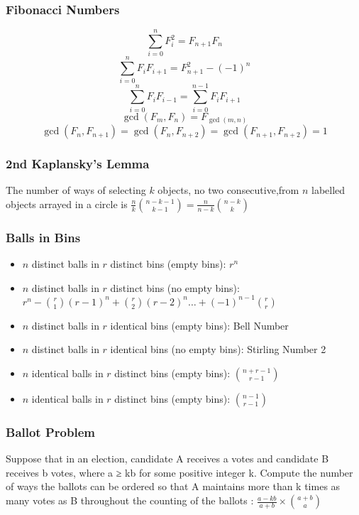 \begin{small}
  \subsubsection{Fibonacci Numbers}
  $$\sum_{i=0}^n F_i^2=F_{n+1} F_n$$
  $$\sum_{i=0}^n F_i F_{i+1}=F_{n+1}^2-(-1)^n$$
  $$\sum_{i=0}^n F_i F_{i-1}=\sum_{i=0}^{n-1} F_i F_{i+1}$$
  $$\operatorname{gcd}\left(F_m, F_n\right)=F_{\operatorname{gcd}(m, n)}$$
  $$\operatorname{gcd}\left(F_n, F_{n+1}\right)=\operatorname{gcd}\left(F_n, F_{n+2}\right)= \operatorname{gcd}\left(F_{n+1}, F_{n+2}\right)=1$$

  \subsubsection{2nd Kaplansky's Lemma}
  The number of ways of selecting \( k \) objects, no two consecutive,from \( n \) labelled objects arrayed in a circle is \( \frac{n}{k} \binom{n-k-1}{k-1} = \frac{n}{n - k} \binom{n-k}{k} \)

  \subsubsection{Balls in Bins}
  \begin{itemize}[noitemsep]
    \itemsep0em 
    \item $n$ distinct balls in $r$ distinct bins (empty bins): $r^{n}$
    \item $n$ distinct balls in $r$ distinct bins (no empty bins): $r^{n} - \binom{r}{1} (r - 1)^{n} + \binom{r}{2} (r - 2)^{n} \ldots + (-1)^{n - 1} \binom{r}{r}$
    \item $n$ distinct balls in $r$ identical bins (empty bins): Bell Number
    \item $n$ distinct balls in $r$ identical bins (no empty bins): Stirling Number 2
    \item $n$ identical balls in $r$ distinct bins (empty bins): $\binom{n + r - 1}{r - 1}$
    \item $n$ identical balls in $r$ distinct bins (empty bins): $\binom{n - 1}{r - 1}$
  \end{itemize}

  \subsubsection{Ballot Problem}
  Suppose that in an election, candidate A receives a votes and candidate B receives b votes, where a ≥ kb for some positive integer k. Compute the number of ways the ballots can be ordered so that A maintains more than k times as many votes as B throughout the counting of the ballots : $\frac{a - kb}{a + b} \times \binom{a + b}{a}$


\end{small}
